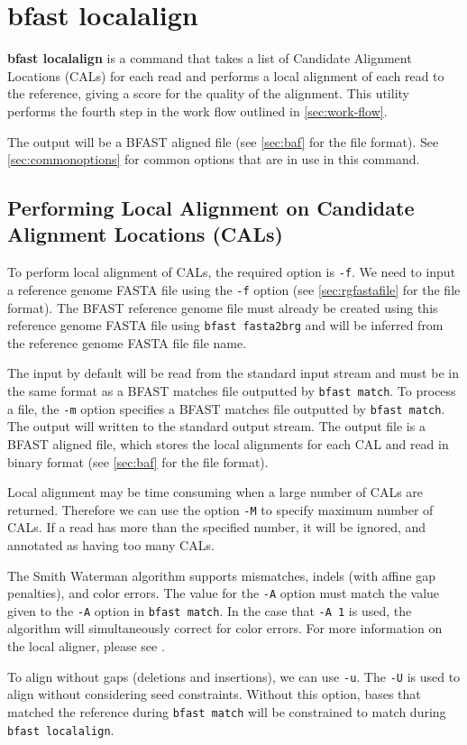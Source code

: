 \documentclass[a4paper,12pt]{book}
\newcommand{\TT}[1]{{\tt #1}} %
\newcommand{\BF}[1]{{\bf #1}} %
\newcommand{\rGFF}{reference genome FASTA file}
\newcommand{\BRGF}{BFAST reference genome file} %
\newcommand{\BMF}{BFAST matches file} %
\newcommand{\BAF}{BFAST aligned file} %
\begin{document}
\section{bfast localalign}
\label{sec:localalign}
\BF{bfast localalign} is a command that takes a list of Candidate Alignment Locations (CALs) for each read and performs a local alignment of each read to the reference, giving a score for the quality of the alignment.
This utility performs the fourth step in the work flow outlined in \autoref{sec:work-flow}.

The output will be a \BAF{} (see \autoref{sec:baf} for the file format).
See \autoref{sec:commonoptions} for common options that are in use in this command.

\subsection{Performing Local Alignment on Candidate Alignment Locations (CALs)}
\label{sec:local-alignment}
To perform local alignment of CALs, the required option is \TT{-f}.
We need to input a \rGFF{} using the \TT{-f} option (see \autoref{sec:rgfastafile} for the file format).
The \BRGF{} must already be created using this \rGFF{} using \TT{bfast fasta2brg} and will be inferred from the \rGFF{} file name.

The input by default will be read from the standard input stream and must be in the same format as a \BMF{} outputted by \TT{bfast match}.
To process a file, the \TT{-m} option specifies a \BMF{} outputted by \TT{bfast match}.
The output will written to the standard output stream.
The output file is a \BAF{}, which stores the local alignments for each CAL and read in binary format (see \autoref{sec:baf} for the file format).

Local alignment may be time consuming when a large number of CALs are returned.
Therefore we can use the option \TT{-M} to specify maximum number of CALs.
If a read has more than the specified number, it will be ignored, and annotated as having too many CALs.


The Smith Waterman algorithm supports mismatches, indels (with affine gap penalties), and color errors.
The value for the \TT{-A} option must match the value given to the \TT{-A} option in \TT{bfast match}.
In the case that \TT{-A 1} is used, the algorithm will simultaneously correct for color errors.
For more information on the local aligner, please see \cite{BFAST-local-alignment}.

To align without gaps (deletions and insertions), we can use \TT{-u}.
The \TT{-U} is used to align without considering seed constraints.  
Without this option, bases that matched the reference during \TT{bfast match} will be constrained to match during \TT{bfast localalign}.
\end{document}
